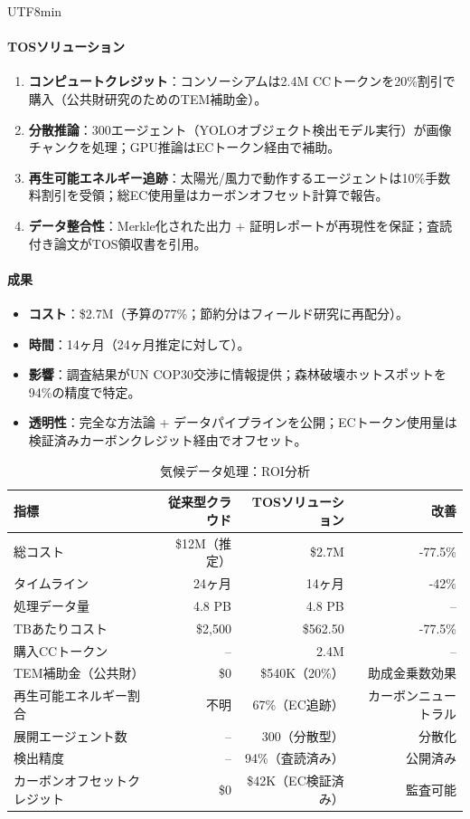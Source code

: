 \documentclass[11pt]{article}
\begin{document}
\begin{CJK}{UTF8}{min}
\begin{itemize}[noitemsep]
\paragraph{TOSソリューション}
\begin{enumerate}[noitemsep]
  \item \textbf{コンピュートクレジット}：コンソーシアムは2.4M CCトークンを20\%割引で購入（公共財研究のためのTEM補助金）。
  \item \textbf{分散推論}：300エージェント（YOLOオブジェクト検出モデル実行）が画像チャンクを処理；GPU推論はECトークン経由で補助。
  \item \textbf{再生可能エネルギー追跡}：太陽光/風力で動作するエージェントは10\%手数料割引を受領；総EC使用量はカーボンオフセット計算で報告。
  \item \textbf{データ整合性}：Merkle化された出力 + 証明レポートが再現性を保証；査読付き論文がTOS領収書を引用。
\end{enumerate}

\paragraph{成果}
\begin{itemize}[noitemsep]
  \item \textbf{コスト}：\$2.7M（予算の77\%；節約分はフィールド研究に再配分）。
  \item \textbf{時間}：14ヶ月（24ヶ月推定に対して）。
  \item \textbf{影響}：調査結果がUN COP30交渉に情報提供；森林破壊ホットスポットを94\%の精度で特定。
  \item \textbf{透明性}：完全な方法論 + データパイプラインを公開；ECトークン使用量は検証済みカーボンクレジット経由でオフセット。
\end{itemize}

\begin{table}[H]
\centering
\caption{気候データ処理：ROI分析}
\label{tab:climate-roi}
\begin{tabular}{@{}lrrr@{}}
\toprule
\textbf{指標} & \textbf{従来型クラウド} & \textbf{TOSソリューション} & \textbf{改善} \\ \midrule
総コスト & \$12M（推定） & \$2.7M & -77.5\% \\
タイムライン & 24ヶ月 & 14ヶ月 & -42\% \\
処理データ量 & 4.8 PB & 4.8 PB & -- \\
TBあたりコスト & \$2,500 & \$562.50 & -77.5\% \\
購入CCトークン & -- & 2.4M & -- \\
TEM補助金（公共財） & \$0 & \$540K（20\%） & 助成金乗数効果 \\
再生可能エネルギー割合 & 不明 & 67\%（EC追跡） & カーボンニュートラル \\
展開エージェント数 & -- & 300（分散型） & 分散化 \\
検出精度 & -- & 94\%（査読済み） & 公開済み \\
カーボンオフセットクレジット & \$0 & \$42K（EC検証済み） & 監査可能 \\
\bottomrule
\end{tabular}
\end{table}


\end{itemize}
\end{CJK}
\end{document}
